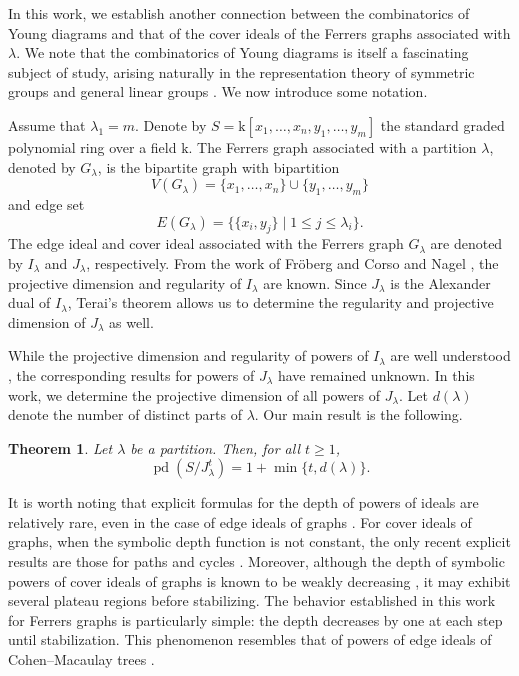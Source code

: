 \documentclass[12pt,amscd]{amsart}
\newtheorem{thm}{Theorem}[section]
\theoremstyle{definition}
\numberwithin{equation}{section}
\DeclareMathOperator{\pd}{pd}
\def\k {\mathrm{k}}
\begin{document}
In this work, we establish another connection between the combinatorics of Young diagrams and that of the cover ideals of the Ferrers graphs associated with $\lambda$. We note that the combinatorics of Young diagrams is itself a fascinating subject of study, arising naturally in the representation theory of symmetric groups and general linear groups \cite{Ful}. We now introduce some notation.

Assume that $\lambda_1 = m$. Denote by \(S = \k[x_1,\ldots,x_n,y_1,\ldots,y_m]
\) the standard graded polynomial ring over a field $\k$. The Ferrers graph associated with a partition $\lambda$, denoted by $G_\lambda$, is the bipartite graph with bipartition
\[
V(G_\lambda) = \{x_1,\ldots,x_n\} \cup \{y_1,\ldots,y_m\}
\]
and edge set
\[
E(G_\lambda)=\bigl\{\{x_i,y_j\} \mid 1 \le j \le \lambda_i \bigr\}.
\]
The edge ideal and cover ideal associated with the Ferrers graph $G_\lambda$ are denoted by $I_\lambda$ and $J_\lambda$, respectively. From the work of Fr\"oberg \cite{Fr} and Corso and Nagel \cite{CN}, the projective dimension and regularity of $I_\lambda$ are known. Since $J_\lambda$ is the Alexander dual of $I_\lambda$, Terai's theorem \cite{Te} allows us to determine the regularity and projective dimension of $J_\lambda$ as well.

While the projective dimension and regularity of powers of $I_\lambda$ are well understood \cite{HHZ,HV1}, the corresponding results for powers of $J_\lambda$ have remained unknown. In this work, we determine the projective dimension of all powers of $J_\lambda$. Let $d(\lambda)$ denote the number of distinct parts of $\lambda$. Our main result is the following.

\begin{thm}\label{thm_pd_power_J}
Let $\lambda$ be a partition. Then, for all $t \ge 1$,
\[
\pd (S/J_\lambda^t) = 1 + \min \{t, d(\lambda)\}.
\]
\end{thm}

It is worth noting that explicit formulas for the depth of powers of ideals are relatively rare, even in the case of edge ideals of graphs \cite{BC,MTV,HHV}. For cover ideals of graphs, when the symbolic depth function is not constant, the only recent explicit results are those for paths \cite{DHNT} and cycles \cite{DHV}. Moreover, although the depth of symbolic powers of cover ideals of graphs is known to be weakly decreasing \cite{HKTT}, it may exhibit several plateau regions before stabilizing. The behavior established in this work for Ferrers graphs is particularly simple: the depth decreases by one at each step until stabilization. This phenomenon resembles that of powers of edge ideals of Cohen--Macaulay trees \cite{HHV}.
\end{document}
